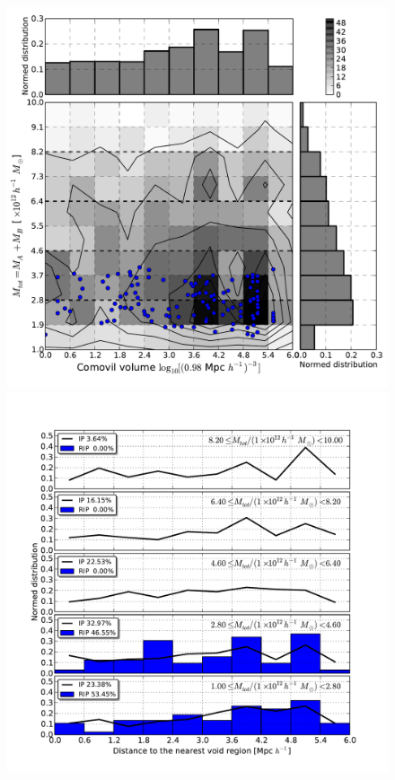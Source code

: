 \documentclass[usenatbib]{latex/mn2e}
\begin{document}
\begin{flushleft}
\begin{figure}
\begin{center}

  \includegraphics[trim = 2mm 9mm 3mm 4mm, clip, keepaspectratio=true,
  width=0.36\textheight]{./figures/2D_totalmass_vvolume_BDM_Tweb}
  \includegraphics[trim = 4mm 9mm 17mm 15mm, clip, keepaspectratio=true,
  width=0.36\textheight]{./figures/single_totalmass_vvolume_BDM_Tweb}
  

\end{center}
\end{figure}
\end{flushleft}
\end{document}
